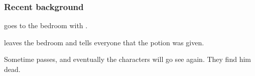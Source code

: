 \subsubsection{Recent background}

 goes to the bedroom with . 

 leaves the bedroom and tells everyone that the potion was given.

Sometime passes, and eventually the characters will go see  again. They find him dead.